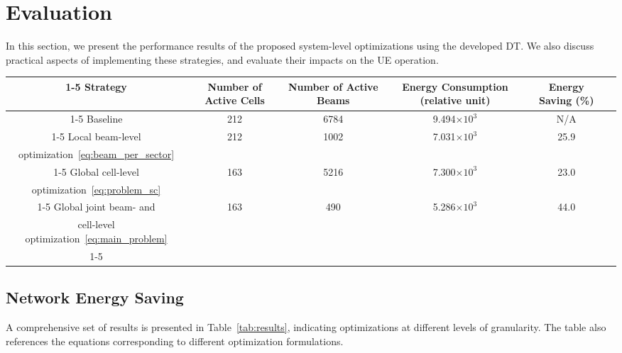 \section{Evaluation}
\label{sec:results}
In this section, we present the performance results of the proposed system-level optimizations using the developed DT. We also discuss practical aspects of implementing these strategies, and evaluate their impacts on the UE operation.


\begin{table*}[]
\begin{center}
\vspace{10pt}
\begin{tabular}{|c|c|c|c|c|c|}
\cline{1-5} 
\textbf{Strategy}  & \textbf{Number of Active Cells} & \textbf{Number of Active Beams}  & \textbf{Energy Consumption (relative unit)} & \textbf{Energy Saving (\%)} \\ \cline{1-5} 
Baseline    &212           & 6784             &9.494$\times 10^3$   & N/A   \\ \cline{1-5}  
Local beam-level       &212          & 1002             &7.031$\times 10^3$   & 25.9   \\ 
optimization~\eqref{eq:beam_per_sector}         &            &           &         &   \\ \cline{1-5}
Global cell-level       &163          & 5216             &7.300$\times 10^3$   & 23.0   \\ 
optimization~\eqref{eq:problem_sc}         &            &           &         &   \\ \cline{1-5}
Global joint beam- and      &163          & 490             &5.286$\times 10^3$   & 44.0   \\ 
cell-level optimization~\eqref{eq:main_problem}      &            &           &         &  \\ \cline{1-5}
\end{tabular} 
\vspace{5pt}
\caption{Network energy savings with system-level optimizations at different level of granularity.}
\label{tab:results}
\end{center}
\vspace{-10pt}
\end{table*}
\vspace{-5pt}
\subsection{Network Energy Saving} 
A comprehensive set of results is presented in Table~\ref{tab:results}, indicating optimizations at different levels of granularity.
The table also references the equations corresponding to different optimization formulations.

